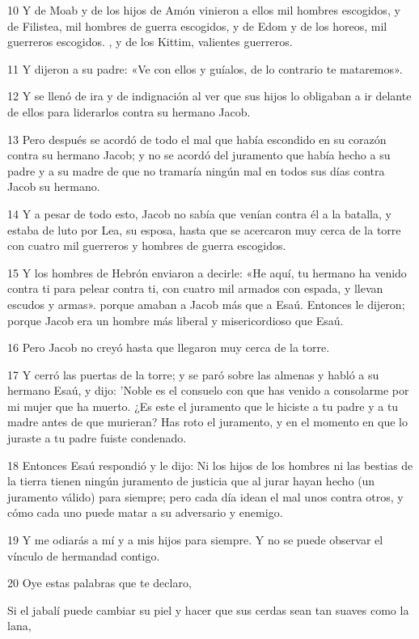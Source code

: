 \par 10 Y de Moab y de los hijos de Amón vinieron a ellos mil hombres escogidos, y de Filistea, mil hombres de guerra escogidos, y de Edom y de los horeos, mil guerreros escogidos. , y de los Kittim, valientes guerreros.
\par 11 Y dijeron a su padre: «Ve con ellos y guíalos, de lo contrario te mataremos».
\par 12 Y se llenó de ira y de indignación al ver que sus hijos lo obligaban a ir delante de ellos para liderarlos contra su hermano Jacob.
\par 13 Pero después se acordó de todo el mal que había escondido en su corazón contra su hermano Jacob; y no se acordó del juramento que había hecho a su padre y a su madre de que no tramaría ningún mal en todos sus días contra Jacob su hermano.
\par 14 Y a pesar de todo esto, Jacob no sabía que venían contra él a la batalla, y estaba de luto por Lea, su esposa, hasta que se acercaron muy cerca de la torre con cuatro mil guerreros y hombres de guerra escogidos.
\par 15 Y los hombres de Hebrón enviaron a decirle: «He aquí, tu hermano ha venido contra ti para pelear contra ti, con cuatro mil armados con espada, y llevan escudos y armas». porque amaban a Jacob más que a Esaú. Entonces le dijeron; porque Jacob era un hombre más liberal y misericordioso que Esaú.
\par 16 Pero Jacob no creyó hasta que llegaron muy cerca de la torre.
\par 17 Y cerró las puertas de la torre; y se paró sobre las almenas y habló a su hermano Esaú, y dijo: 'Noble es el consuelo con que has venido a consolarme por mi mujer que ha muerto. ¿Es este el juramento que le hiciste a tu padre y a tu madre antes de que murieran? Has roto el juramento, y en el momento en que lo juraste a tu padre fuiste condenado.
\par 18 Entonces Esaú respondió y le dijo: Ni los hijos de los hombres ni las bestias de la tierra tienen ningún juramento de justicia que al jurar hayan hecho (un juramento válido) para siempre; pero cada día idean el mal unos contra otros, y cómo cada uno puede matar a su adversario y enemigo.
\par 19 Y me odiarás a mí y a mis hijos para siempre. Y no se puede observar el vínculo de hermandad contigo.
\par 20 Oye estas palabras que te declaro,
\par    
\par     Si el jabalí puede cambiar su piel y hacer que sus cerdas sean tan suaves como la lana,  
